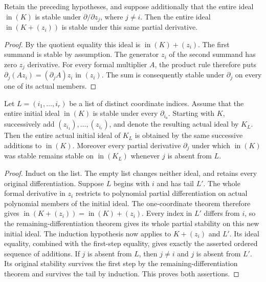 \begin{theorem}
\label{hir:actual-initial-coordinate-quotient-remaining-differentiation}
\leanok
Retain the preceding hypotheses, and suppose additionally that the entire
ideal $\operatorname{in}(K)$ is stable under $\partial/\partial z_j$,
where $j\ne i$. Then the entire ideal
$\operatorname{in}(K+(z_i))$ is stable under this same partial derivative.
\end{theorem}
\begin{proof}
By the quotient equality this ideal is
$\operatorname{in}(K)+(z_i)$. The first summand is stable by assumption.
The generator $z_i$ of the second summand has zero $z_j$ derivative.
For every formal multiplier $A$, the product rule therefore puts
$\partial_j(Az_i)=(\partial_jA)z_i$ in $(z_i)$. The sum is consequently
stable under $\partial_j$ on every one of its actual members.
\end{proof}

\begin{theorem}
\label{hir:actual-initial-coordinate-quotient-ordered-cuts}
\leanok
Let $L=(i_1,\ldots,i_r)$ be a list of distinct coordinate indices.
Assume that the entire initial ideal $\operatorname{in}(K)$ is stable
under every $\partial_{i_a}$. Starting with $K$, successively add
$(z_{i_1}),\ldots,(z_{i_r})$, and denote the resulting actual ideal by
$K_L$. Then the entire actual initial ideal of $K_L$ is obtained by
the same successive additions to $\operatorname{in}(K)$.
Moreover every partial derivative $\partial_j$ under which
$\operatorname{in}(K)$ was stable remains stable on
$\operatorname{in}(K_L)$ whenever $j$ is absent from $L$.
\end{theorem}
\begin{proof}
Induct on the list. The empty list changes neither ideal, and retains
every original differentiation. Suppose $L$ begins with $i$ and has
tail $L'$. The whole formal derivative in $z_i$ restricts to polynomial
partial differentiation on actual polynomial members of the initial
ideal. The one-coordinate theorem therefore gives
$\operatorname{in}(K+(z_i))=\operatorname{in}(K)+(z_i)$.
Every index in $L'$ differs from $i$, so the remaining-differentiation
theorem gives its whole partial stability on this new initial ideal.
The induction hypothesis now applies to $K+(z_i)$ and $L'$. Its ideal
equality, combined with the first-step equality, gives exactly the
asserted ordered sequence of additions. If $j$ is absent from $L$,
then $j\ne i$ and $j$ is absent from $L'$. Its original stability
survives the first step by the remaining-differentiation theorem and
survives the tail by induction. This proves both assertions.
\end{proof}
